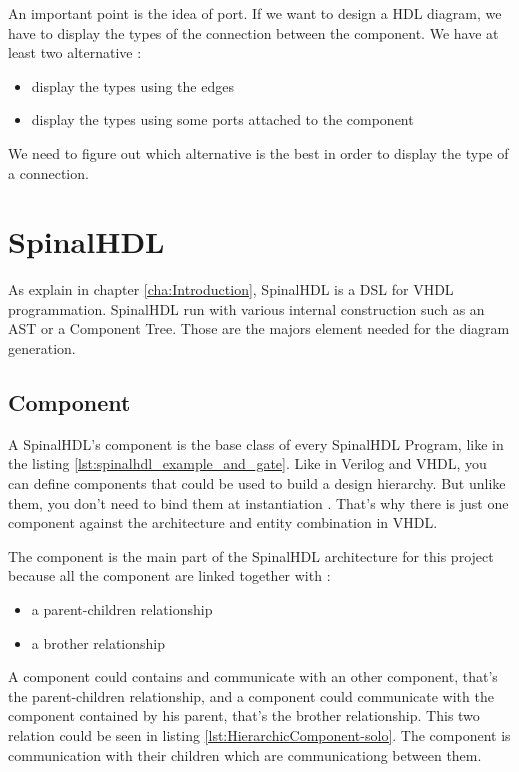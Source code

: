 An important point is the idea of port. If we want to design a HDL diagram, we have to display the types of the connection between the component. We have at least two alternative :
\begin{itemize}
 \item display the types using the edges
 \item display the types using some ports attached to the component
\end{itemize}

We need to figure out which alternative is the best in order to display the type of a connection.


\section{SpinalHDL} %
\label{sec:SpinalHDL}

As explain in chapter \ref{cha:Introduction}, SpinalHDL is a DSL for VHDL programmation. SpinalHDL run with various internal construction such as an AST or a Component Tree. Those are the majors element needed for the diagram generation.

\subsection{Component} %
\label{sub:Component}

A SpinalHDL's component is the base class of every SpinalHDL Program, like in the listing \ref{lst:spinalhdl_example_and_gate}. Like in Verilog and VHDL, you can define components that could be used to build a design hierarchy. But unlike them, you don’t need to bind them at instantiation \cite{github-spinalhdl}. That's why there is just one component against the architecture and entity combination in VHDL.

The component is the main part of the SpinalHDL architecture for this project because all the component are linked together with :
\begin{itemize}
    \item a parent-children relationship
    \item a brother relationship
\end{itemize}

A component could contains and communicate with an other component, that's the parent-children relationship, and a component could communicate with the component contained by his parent, that's the brother relationship. This two relation could be seen in listing \ref{lst:HierarchicComponent-solo}. The component is communication with their children which are communicationg between them.

